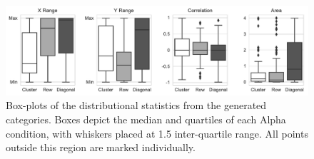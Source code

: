 \documentclass[10pt,letterpaper]{article}
\begin{document}

\begin{figure}%
\begin{center}
    \includegraphics[width=\textwidth]{Figures/stats_cond.pdf}
\end{center}
\caption{Box-plots of the distributional statistics from the generated categories. Boxes depict the median and quartiles of each Alpha condition, with whiskers placed at 1.5 inter-quartile range. All points outside this region are marked individually.} 
\label{fig:stats_cond}
\end{figure}
\end{document}
